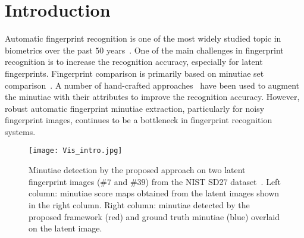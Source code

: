 \documentclass[10pt,twocolumn,letterpaper]{article}
\begin{document}
\section{Introduction}
Automatic fingerprint recognition is one of the most widely studied topic in biometrics over the past $50$ years~\cite{jain201650}. One of the main challenges in fingerprint recognition is to increase the recognition accuracy, especially for latent fingerprints. Fingerprint comparison is primarily based on minutiae set comparison~\cite{zhao2007preprocessing, jain2007pores}. A number of hand-crafted approaches~\cite{jain1997line,zhao2007preprocessing} have been used to augment the minutiae with their attributes to improve the recognition accuracy. However, robust automatic fingerprint minutiae extraction, particularly for noisy fingerprint images, continues to be a bottleneck in fingerprint recognition systems.

\begin{figure}[!tbp]
\centering
\texttt{[image: Vis\_intro.jpg]}
\caption{Minutiae detection by the proposed approach on two latent fingerprint images ($\#7$ and $\#39$) from the NIST SD27 dataset~\cite{garris2000nist}. Left column: minutiae score maps obtained from the latent images shown in the right column. Right column: minutiae detected by the proposed framework (red) and ground truth minutiae (blue) overlaid on the latent image.}
\label{fig:Vis_intro}
\end{figure}
\end{document}
